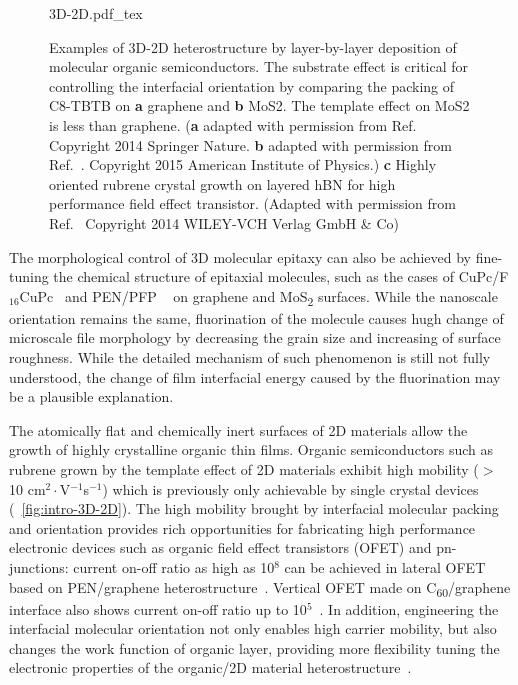 \begin{figure}[!htbp]
  \centering
  {3D-2D.pdf_tex}
  \caption{\label{fig:intro-3D-2D}%
    Examples of 3D-2D heterostructure by layer-by-layer deposition of
    molecular organic semiconductors. The substrate effect is critical
    for controlling the interfacial orientation by comparing the
    packing of C8-TBTB on \textbf{a} graphene and \textbf{b} MoS2. The
    template effect on MoS2 is less than graphene. (\textbf{a} adapted
    with permission from Ref.~\cite{He_2014_C8BTBT_gr} Copyright 2014
    Springer Nature. \textbf{b} adapted with permission from
    Ref.~\cite{He_2015_C8BTBT_MoS2}. Copyright 2015 American Institute
    of Physics.) \textbf{c} Highly oriented rubrene crystal growth on
    layered hBN for high performance field effect transistor. (Adapted
    with permission from Ref.~\cite{Lee_2014_rubene_hBN} Copyright
    2014 WILEY-VCH Verlag GmbH \& Co)%
  }
\end{figure}

The morphological control of 3D molecular epitaxy can also be achieved
by fine-tuning the chemical structure of epitaxial molecules, such as
the cases of
CuPc/F\(_{\text{16}}\)CuPc~\autocite{Singha_Roy_2012_CuPc_gr_glass,Xiao_2013_jacs_CuPc_gr,Zhong_2012_gr_F16_pn_junc,Yang_2011_F16CUPc_nanowire}
and
PEN/PFP ~\autocite{Salzmann_2012_fpen_gr,Breuer_2011_pent_graph}
on graphene and MoS\textsubscript{2} surfaces.
%
While the nanoscale orientation remains the same, fluorination of the
molecule causes hugh change of micro\-scale file morphology by
decreasing the grain size and increasing of surface roughness.
%
While the detailed mechanism of such phenomenon is still not fully
understood, the change of film interfacial energy caused by the
fluorination may be a plausible explanation.

The atomically flat and chemically inert surfaces of 2D materials
allow the growth of highly crystalline organic thin films. Organic
semiconductors such as rubrene grown by the template effect of 2D
materials exhibit high mobility ($>$ 10 cm$^{2}\cdot$V$^{-1}$s$^{-1}$)
which is previously only achievable by single
crystal devices~\autocite{Lee_2014_rubene_hBN} (~\autoref{fig:intro-3D-2D}).
%
The high mobility brought by interfacial molecular packing and
orientation provides rich opportunities for fabricating high performance
electronic devices such as organic field effect transistors (OFET) and
pn-junctions:
%
current on-off ratio as high as 10$^{8}$ can be achieved in lateral
OFET based on PEN/graphene heterostructure~\autocite{Lee_2011_pentacene}.
%
Vertical OFET made on C\textsubscript{60}/graphene interface also
shows current on-off ratio up to
10$^{5}$~\autocite{Shih_2015_PartiallyScreened}.
%
In addition, engineering the interfacial molecular orientation
not only enables high carrier mobility, but also changes the work
function of organic layer, providing more flexibility tuning the
electronic properties of the organic/2D material
heterostructure~\autocite{Zhong_2014_gr_F16_EF,Wu_2013_CuPc_F16_gr}.




